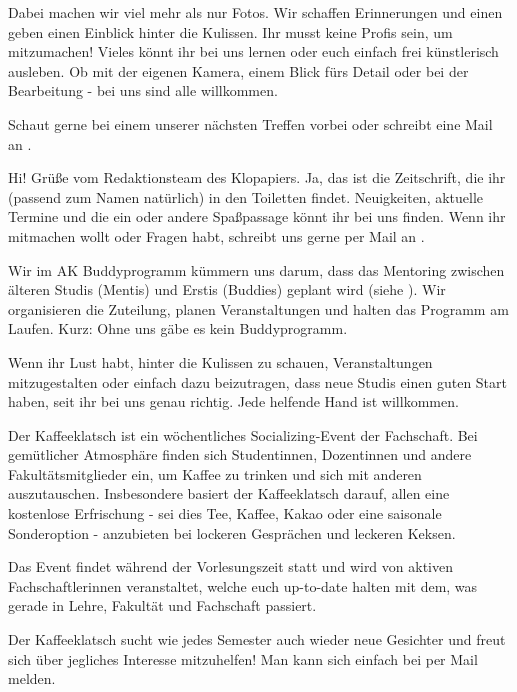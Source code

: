 \begin{description}
	Dabei machen wir viel mehr als nur Fotos. Wir schaffen Erinnerungen und einen geben einen Einblick hinter die Kulissen. Ihr musst keine Profis sein, um mitzumachen! Vieles könnt ihr bei uns lernen oder euch einfach frei künstlerisch ausleben. Ob mit der eigenen Kamera, einem Blick fürs Detail oder bei der Bearbeitung - bei uns sind alle willkommen.

	Schaut gerne bei einem unserer nächsten Treffen vorbei oder schreibt eine Mail an .
	
	\item[AK Klopapier]
	Hi! Grüße vom Redaktionsteam des Klopapiers. Ja, das ist die Zeitschrift, die ihr (passend zum Namen natürlich) in den Toiletten findet. Neuigkeiten, aktuelle Termine und die ein oder andere Spaßpassage könnt ihr bei uns finden. Wenn ihr mitmachen wollt oder Fragen habt, schreibt uns gerne per Mail an .
	
	\item[Das Buddyprogramm]
	Wir im AK Buddyprogramm kümmern uns darum, dass das Mentoring zwischen älteren Studis (Mentis) und Erstis (Buddies) geplant wird (siehe ). Wir organisieren die Zuteilung, planen Veranstaltungen und halten das Programm am Laufen. Kurz: Ohne uns gäbe es kein Buddyprogramm.
	
	Wenn ihr Lust habt, hinter die Kulissen zu schauen, Veranstaltungen mitzugestalten oder einfach dazu beizutragen, dass neue Studis einen guten Start haben, seit ihr bei uns genau richtig. Jede helfende Hand ist willkommen.
	
	\item[Der Kaffeeklatsch]
	Der Kaffeeklatsch ist ein wöchentliches Socializing-Event der Fachschaft. Bei gemütlicher Atmosphäre finden sich Studentinnen, Dozentinnen und andere Fakultätsmitglieder ein, um Kaffee zu trinken und sich mit anderen auszutauschen. Insbesondere basiert der Kaffeeklatsch darauf, allen eine kostenlose Erfrischung - sei dies Tee, Kaffee, Kakao oder eine saisonale Sonderoption - anzubieten bei lockeren Gesprächen und leckeren Keksen.
	
	Das Event findet während der Vorlesungszeit statt und wird von aktiven Fachschaftlerinnen veranstaltet, welche euch up-to-date halten mit dem, was gerade in Lehre, Fakultät und Fachschaft passiert.
	
	Der Kaffeeklatsch sucht wie jedes Semester auch wieder neue Gesichter und freut sich über jegliches Interesse mitzuhelfen! Man kann sich einfach bei  per Mail melden.%
	

\end{description}

